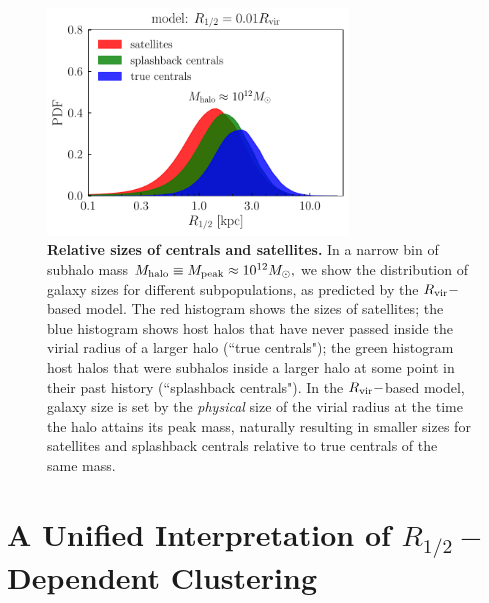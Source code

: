\documentclass[usenatbib,usegraphicx,letterpaper]{mn2e}
\newcommand{\rhalf}{R_{1/2}}
\newcommand{\mpeak}{M_{\rm peak}}
\newcommand{\mhalo}{M_{\rm halo}}
\newcommand{\rvir}{R_{\rm vir}}
\newcommand{\msun}{M_\odot}
\begin{document}
\begin{figure}
\centering
\includegraphics[width=8cm]{FIGS/rvir_only_cen_sat_sizes.pdf}
\caption{
{\bf Relative sizes of centrals and satellites.}
In a narrow bin of subhalo mass $\mhalo\equiv\mpeak\approx10^{12}\msun,$ we show the distribution of galaxy sizes for different subpopulations, as predicted by the $\rvir-$based model. The red histogram shows the sizes of satellites; the blue histogram shows host halos that have never passed inside the virial radius of a larger halo (``true centrals"); the green histogram host halos that were subhalos inside a larger halo at some point in their past history (``splashback centrals"). In the $\rvir-$based model, galaxy size is set by the {\em physical} size of the virial radius at the time the halo attains its peak mass, naturally resulting in smaller sizes for satellites and splashback centrals relative to true centrals of the same mass.
}
\label{fig:censatsizehist}
\end{figure}


\section{A Unified Interpretation of $\rhalf-$Dependent Clustering}
\label{sec:interpretation}
\end{document}

